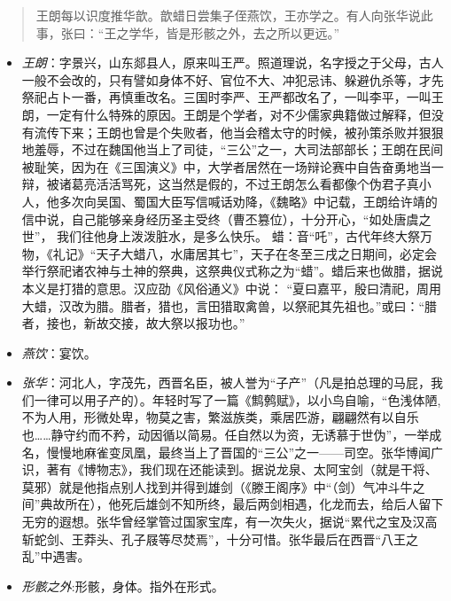 \documentclass[]{book}
\providecommand{\tightlist}{%
  \setlength{\itemsep}{0pt}\setlength{\parskip}{0pt}}
\begin{document}
\begin{quote}
王朗每以识度推华歆。歆蜡日尝集子侄燕饮，王亦学之。有人向张华说此事，张曰：``王之学华，皆是形骸之外，去之所以更远。''
\end{quote}

\begin{itemize}
\tightlist
\item
  \emph{王朗}：字景兴，山东郯县人，原来叫王严。照道理说，名字授之于父母，古人一般不会改的，只有譬如身体不好、官位不大、冲犯忌讳、躲避仇杀等，才先祭祀占卜一番，再慎重改名。三国时李严、王严都改名了，一叫李平，一叫王朗，一定有什么特殊的原因。王朗是个学者，对不少儒家典籍做过解释，但没有流传下来；王朗也曾是个失败者，他当会稽太守的时候，被孙策杀败并狠狠地羞辱，不过在魏国他当上了司徒，``三公''之一，大司法部部长；王朗在民间被耻笑，因为在《三国演义》中，大学者居然在一场辩论赛中自告奋勇地当一辩，被诸葛亮活活骂死，这当然是假的，不过王朗怎么看都像个伪君子真小人，他多次向吴国、蜀国大臣写信喊话劝降，《魏略》中记载，王朗给许靖的信中说，自己能够亲身经历圣主受终（曹丕篡位），十分开心，``如处唐虞之世''，
  我们往他身上泼泼脏水，是多么快乐。
  蜡：音``吒''，古代年终大祭万物，《礼记》``天子大蜡八，水庸居其七''，天子在冬至三戌之日期间，必定会举行祭祀诸农神与土神的祭典，这祭典仪式称之为``蜡''。蜡后来也做腊，据说本义是打猎的意思。汉应劭《风俗通义》中说：
  ``夏曰嘉平，殷曰清祀，周用大蜡，汉改为腊。腊者，猎也，言田猎取禽兽，以祭祀其先祖也。''或曰：``腊者，接也，新故交接，故大祭以报功也。''
\item
  \emph{燕饮}：宴饮。
\item
  \emph{张华}：河北人，字茂先，西晋名臣，被人誉为``子产''（凡是拍总理的马屁，我们一律可以用子产的）。年轻时写了一篇《鹪鹩赋》，以小鸟自喻，``色浅体陋,不为人用，形微处卑，物莫之害，繁滋族类，乘居匹游，翩翩然有以自乐也\ldots{}\ldots{}静守约而不矜，动因循以简易。任自然以为资，无诱慕于世伪''，一举成名，慢慢地麻雀变凤凰，最终当上了晋国的``三公''之一------司空。张华博闻广识，著有《博物志》，我们现在还能读到。据说龙泉、太阿宝剑（就是干将、莫邪）就是他指点别人找到并得到雄剑（《滕王阁序》中``（剑）气冲斗牛之间''典故所在），他死后雄剑不知所终，最后两剑相遇，化龙而去，给后人留下无穷的遐想。张华曾经掌管过国家宝库，有一次失火，据说``累代之宝及汉高斩蛇剑、王莽头、孔子屐等尽焚焉''，十分可惜。张华最后在西晋``八王之乱''中遇害。
\item
  \emph{形骸之外}:形骸，身体。指外在形式。
\end{itemize}
\end{document}

